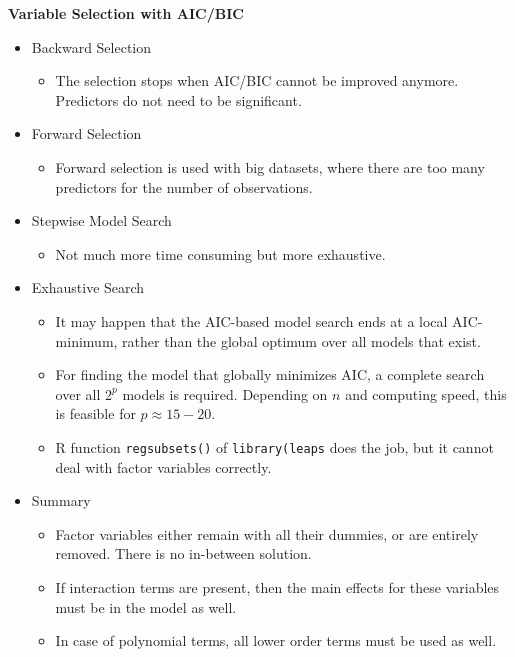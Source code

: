\documentclass[a4paper]{article}
\begin{document}
\textbf{Variable Selection with AIC/BIC}
\begin{itemize}
    \item Backward Selection
    \begin{itemize}
        \item The selection stops when AIC/BIC cannot be improved anymore. Predictors do not need to be significant.
    \end{itemize}
    \item Forward Selection
    \begin{itemize}
        \item Forward selection is used with big datasets, where there are too many predictors for the number of observations.
    \end{itemize}
    \item Stepwise Model Search
    \begin{itemize}
        \item Not much more time consuming but more exhaustive.
    \end{itemize}
    \item Exhaustive Search
    \begin{itemize}
        \item It may happen that the AIC-based model search ends at a local AIC-minimum, rather than the global optimum over all models that exist.
        \item For finding the model that globally minimizes AIC, a complete search over all $2^p$ models is required. Depending on $n$ and computing speed, this is feasible for $p\approx15-20$.
        \item R function \texttt{regsubsets()} of \texttt{library(leaps} does the job, but it cannot deal with factor variables correctly.
    \end{itemize}
    \item Summary
    \begin{itemize}
        \item Factor variables either remain with all their dummies, or are entirely removed. There is no in-between solution.
        \item If interaction terms are present, then the main effects for these variables must be in the model as well.
        \item In case of polynomial terms, all lower order terms must be used as well.
    \end{itemize}
\end{itemize}
\end{document}

